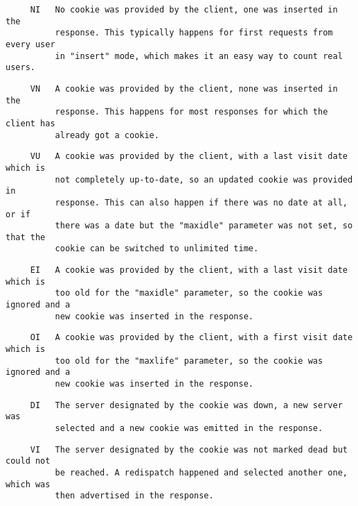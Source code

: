 \begin{verbatim}
     NI   No cookie was provided by the client, one was inserted in the
          response. This typically happens for first requests from every user
          in "insert" mode, which makes it an easy way to count real users.
\end{verbatim}

\begin{verbatim}
     VN   A cookie was provided by the client, none was inserted in the
          response. This happens for most responses for which the client has
          already got a cookie.
\end{verbatim}

\begin{verbatim}
     VU   A cookie was provided by the client, with a last visit date which is
          not completely up-to-date, so an updated cookie was provided in
          response. This can also happen if there was no date at all, or if
          there was a date but the "maxidle" parameter was not set, so that the
          cookie can be switched to unlimited time.
\end{verbatim}

\begin{verbatim}
     EI   A cookie was provided by the client, with a last visit date which is
          too old for the "maxidle" parameter, so the cookie was ignored and a
          new cookie was inserted in the response.
\end{verbatim}

\begin{verbatim}
     OI   A cookie was provided by the client, with a first visit date which is
          too old for the "maxlife" parameter, so the cookie was ignored and a
          new cookie was inserted in the response.
\end{verbatim}

\begin{verbatim}
     DI   The server designated by the cookie was down, a new server was
          selected and a new cookie was emitted in the response.
\end{verbatim}

\begin{verbatim}
     VI   The server designated by the cookie was not marked dead but could not
          be reached. A redispatch happened and selected another one, which was
          then advertised in the response.
\end{verbatim}

